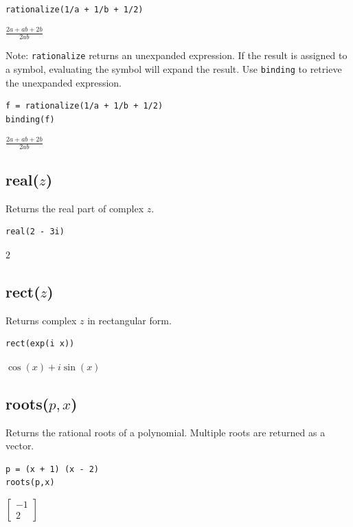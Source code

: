 \documentclass[12pt]{article}
\begin{document}
{\color{blue}
\begin{verbatim}
rationalize(1/a + 1/b + 1/2)
\end{verbatim}
}

$\displaystyle \frac{2a+ab+2b}{2ab}$

\bigskip
Note:
\verb$rationalize$
returns an unexpanded expression.
If the result is assigned to a symbol, evaluating the symbol will expand the result.
Use
\verb$binding$
to retrieve the unexpanded expression.

{\color{blue}
\begin{verbatim}
f = rationalize(1/a + 1/b + 1/2)
binding(f)
\end{verbatim}
}

$\displaystyle \frac{2a+ab+2b}{2ab}$

\subsection*{real($z$)}

Returns the real part of complex $z$.

{\color{blue}
\begin{verbatim}
real(2 - 3i)
\end{verbatim}
}

$2$

\subsection*{rect($z$)}

Returns complex $z$ in rectangular form.

{\color{blue}
\begin{verbatim}
rect(exp(i x))
\end{verbatim}
}

$\displaystyle \cos(x)+i\sin(x)$

\subsection*{roots($p,x$)}

Returns the rational roots of a polynomial.
Multiple roots are returned as a vector.

{\color{blue}
\begin{verbatim}
p = (x + 1) (x - 2)
roots(p,x)
\end{verbatim}
}

$\displaystyle
\begin{bmatrix}
-1
\\[1ex]
2
\end{bmatrix}
$
\end{document}
